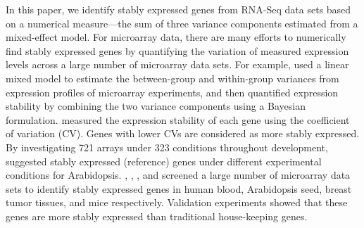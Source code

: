 	In this paper, we identify stably expressed genes from RNA-Seq data sets based
	on a numerical measure---the sum of three variance components estimated from a
	mixed-effect model. 
	For microarray data, there are many efforts to numerically find stably
	expressed genes by quantifying the variation of measured expression levels
	across a large number of microarray data sets.  For example,
	\cite{andersen2004normalization} used a linear mixed model to estimate the
	between-group and within-group variances from expression profiles of
	microarray experiments, and then quantified expression stability by combining
	the two variance components using a Bayesian formulation. 
	\cite{czechowski2005genome} measured the expression stability of each gene
	using the coefficient of variation (CV). Genes with lower CVs are considered
	as more stably expressed.  By investigating 721 arrays under 323 conditions
	throughout development, \cite{czechowski2005genome} suggested stably expressed
	(reference) genes under different experimental conditions for Arabidopsis.
	\cite{stamova2009identification},  \citet{dekkers2012identification}, \citet{gur2009identification}, and
	\citet{frericks2008toolbox} screened a large number of microarray data sets
	to identify stably expressed genes in human blood, Arabidopsis seed, breast tumor tissues,
	and mice respectively.
	Validation experiments \citep{czechowski2005genome,
		dekkers2012identification, huggett2005real,stamova2009identification} showed
	that these genes are more stably expressed than traditional house-keeping
	genes.  
	
	
